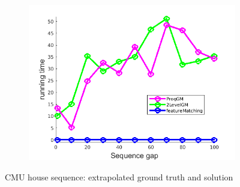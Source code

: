 \begin{figure}[h]
\begin{subfigure}[b]{0.3\textwidth}
		\includegraphics[scale=0.25]{"chapter3/fig/HouseSeq/anchor_descr/using_cpd_afftrafo/ext_solution/performance/time"}  
	\end{subfigure} 	
	\caption{CMU house sequence: extrapolated ground truth and solution}
\end{figure}
\vspace{-20pt}
